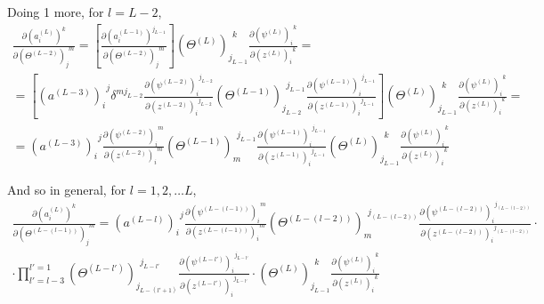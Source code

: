 \documentclass[10pt]{amsart}
\begin{document}
\begin{multicols*}{2}
Doing 1 more, for $l=L-2$, 
\[
\begin{gathered}
\frac{\partial (a_i^{(L)})^k }{ \partial (\Theta^{(L-2)})_j^{\  \  m} } =  \left[  \frac{\partial (a_i^{(L-1)})^{j_{L-1} }}{ \partial (\Theta^{(L-2)})_j^{\  \  m} } \right]  (\Theta^{(L)})_{ j_{L-1}}^{\  \  k}      \frac{ \partial (\psi^{(L)})_i^{\  \  k } }{ \partial (z^{(L)})_i^{\  \  k} } = \\
= \left[ (a^{(L-3)})_i^{\  \  j} \delta^{m j_{L-2}}  \frac{ \partial (\psi^{(L-2)})_i^{\  \  j_{L-2} } }{ \partial (z^{(L-2)})_i^{\  \  j_{L-2}} }  (\Theta^{(L-1)})_{ j_{L-2}}^{\  \  j_{L-1}}    \frac{ \partial (\psi^{(L-1)})_i^{\  \  j_{L-1} } }{ \partial (z^{(L-1)})_i^{\  \  j_{L-1}} } \right]  (\Theta^{(L)})_{ j_{L-1}}^{\  \  k}      \frac{ \partial (\psi^{(L)})_i^{\  \  k } }{ \partial (z^{(L)})_i^{\  \  k} } = \\
=  (a^{(L-3)})_i^{\  \  j}    \frac{ \partial (\psi^{(L-2)})_i^{\  \  m } }{ \partial (z^{(L-2)})_i^{\  \   m } }  (\Theta^{(L-1)})_{ m }^{\  \  j_{L-1}}    \frac{ \partial (\psi^{(L-1)})_i^{\  \  j_{L-1} } }{ \partial (z^{(L-1)})_i^{\  \  j_{L-1}} }   (\Theta^{(L)})_{ j_{L-1}}^{\  \  k}      \frac{ \partial (\psi^{(L)})_i^{\  \  k } }{ \partial (z^{(L)})_i^{\  \  k} }
\end{gathered}
\]

And so in general, for $l=1,2,\dots L$, 
\begin{equation}\label{Eq:DNNpartialaL_noKroneckerdelta}
\boxed{ \begin{gathered}
\frac{\partial (a_i^{(L)})^k }{ \partial (\Theta^{(L-(l-1))})_j^{\  \  m} } =   (a^{(L-l)})_i^{\  \  j}    \frac{ \partial (\psi^{(L-(l-1))})_i^{\  \  m } }{ \partial (z^{(L-(l-1))})_i^{\  \   m } }  (\Theta^{(L-(l-2))})_m^{\  \  j_{(L-(l-2))}}      \frac{ \partial (\psi^{(L-(l-2))})_i^{\  \  j_{(L-(l-2))} } }{ \partial (z^{(L-(l-2))})_i^{\  \  j_{(L-(l-2))}} } \cdot \\
\cdot \prod_{l' = l-3}^{l'=1} (\Theta^{(L-l')})_{ j_{L-(l'+1)}}^{\  \  j_{L-l'}}      \frac{ \partial (\psi^{(L-l')})_i^{\  \  j_{L-l'} } }{ \partial (z^{(L-l')})_i^{\  \  j_{L-l'}} } \cdot (\Theta^{(L)})_{ j_{L-1}}^{\  \  k}      \frac{ \partial (\psi^{(L)})_i^{\  \  k } }{ \partial (z^{(L)})_i^{\  \  k} }
\end{gathered} 
}
\end{equation}


\end{multicols*}
\end{document}
